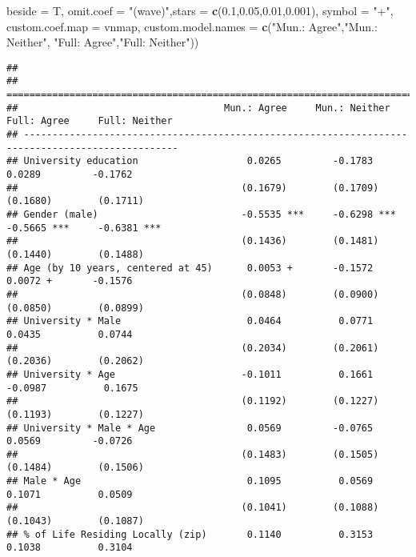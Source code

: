 \documentclass[
]{article}
\newenvironment{Shaded}{\begin{snugshade}}{\end{snugshade}}
\newcommand{\DataTypeTok}[1]{\textcolor[rgb]{0.13,0.29,0.53}{#1}}
\newcommand{\FloatTok}[1]{\textcolor[rgb]{0.00,0.00,0.81}{#1}}
\newcommand{\KeywordTok}[1]{\textcolor[rgb]{0.13,0.29,0.53}{\textbf{#1}}}
\newcommand{\NormalTok}[1]{#1}
\newcommand{\StringTok}[1]{\textcolor[rgb]{0.31,0.60,0.02}{#1}}
\begin{document}
\begin{Shaded}
\begin{Highlighting}[]
          \DataTypeTok{beside =}\NormalTok{ T,}
          \DataTypeTok{omit.coef =} \StringTok{"(wave)"}\NormalTok{,}\DataTypeTok{stars =} \KeywordTok{c}\NormalTok{(}\FloatTok{0.1}\NormalTok{,}\FloatTok{0.05}\NormalTok{,}\FloatTok{0.01}\NormalTok{,}\FloatTok{0.001}\NormalTok{), }\DataTypeTok{symbol =} \StringTok{"+"}\NormalTok{,}
          \DataTypeTok{custom.coef.map =}\NormalTok{ vnmap,}
          \DataTypeTok{custom.model.names =} \KeywordTok{c}\NormalTok{(}\StringTok{"Mun.: Agree"}\NormalTok{,}\StringTok{"Mun.: Neither"}\NormalTok{,}
                                 \StringTok{"Full: Agree"}\NormalTok{,}\StringTok{"Full: Neither"}\NormalTok{))}
\end{Highlighting}
\end{Shaded}

\begin{verbatim}
## 
## =================================================================================================
##                                    Mun.: Agree     Mun.: Neither   Full: Agree     Full: Neither 
## -------------------------------------------------------------------------------------------------
## University education                   0.0265         -0.1783          0.0289         -0.1762    
##                                       (0.1679)        (0.1709)        (0.1680)        (0.1711)   
## Gender (male)                         -0.5535 ***     -0.6298 ***     -0.5665 ***     -0.6381 ***
##                                       (0.1436)        (0.1481)        (0.1440)        (0.1488)   
## Age (by 10 years, centered at 45)      0.0053 +       -0.1572          0.0072 +       -0.1576    
##                                       (0.0848)        (0.0900)        (0.0850)        (0.0899)   
## University * Male                      0.0464          0.0771          0.0435          0.0744    
##                                       (0.2034)        (0.2061)        (0.2036)        (0.2062)   
## University * Age                      -0.1011          0.1661         -0.0987          0.1675    
##                                       (0.1192)        (0.1227)        (0.1193)        (0.1227)   
## University * Male * Age                0.0569         -0.0765          0.0569         -0.0726    
##                                       (0.1483)        (0.1505)        (0.1484)        (0.1506)   
## Male * Age                             0.1095          0.0569          0.1071          0.0509    
##                                       (0.1041)        (0.1088)        (0.1043)        (0.1087)   
## % of Life Residing Locally (zip)       0.1140          0.3153          0.1038          0.3104    

\end{verbatim}
\end{document}
